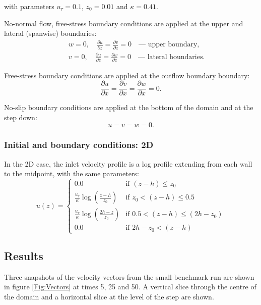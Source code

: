 with parameters $u_{\tau} = 0.1$, $z_0 = 0.01$ and $\kappa = 0.41$.


No-normal flow, free-stress boundary conditions are applied at the upper and lateral
(spanwise) boundaries:
\begin{eqnarray*}
&&w=0,\quad \frac{\partial u}{\partial z} = \frac{\partial v}{\partial z} = 0 \quad\textrm{--- upper boundary},\\
&&v=0,\quad \frac{\partial u}{\partial z} = \frac{\partial w}{\partial z} = 0 \quad\textrm{--- lateral boundaries}.
\end{eqnarray*}

Free-stress boundary conditions are applied at the outflow boundary boundary:
\begin{equation*}
\frac{\partial u}{\partial x} = \frac{\partial v}{\partial x} = \frac{\partial w}{\partial x} = 0.
\end{equation*}

No-slip boundary conditions are applied at the bottom of the domain and at the step down:
\begin{equation*}
u=v=w=0.
\end{equation*}

\subsubsection{Initial and boundary conditions: 2D}
In the 2D case, the inlet velocity profile is a log profile extending from each wall to the midpoint, with the same parameters:
\begin{equation*}
u(z) =
  \begin{cases}
    0.0 & \text{if } (z-h) \leq z_0 \\
    \frac{u_{\tau}}{\kappa} \log \left(\frac{z - h}{z_0}\right) & \text{if } z_0 < (z-h) \leq 0.5 \\
    \frac{u_{\tau}}{\kappa} \log \left(\frac{2h - z}{z_0}\right) & \text{if } 0.5 < (z-h) \leq (2h-z_0) \\
    0.0 & \text{if } 2h-z_0 < (z-h)
  \end{cases}
\end{equation*}


\subsection{Results}
Three snapshots of the velocity vectors from the small benchmark run
are shown in figure \ref{Fig:Vectors} at times
5, 25 and 50. A vertical slice through the centre of the domain and a horizontal slice
at the level of the step are shown.


